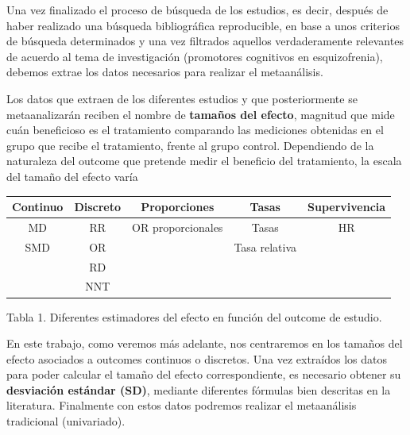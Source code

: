 \documentclass[a4paper,openright,12pt]{report}
\begin{document}
Una vez finalizado el proceso de búsqueda de los estudios, es decir, después de haber realizado una búsqueda bibliográfica reproducible,  en base a unos criterios de búsqueda determinados y una vez filtrados aquellos verdaderamente relevantes de acuerdo al tema de investigación (promotores cognitivos en esquizofrenia), debemos extrae los datos necesarios para realizar el metaanálisis.

Los datos que extraen de los diferentes estudios y que posteriormente se metaanalizarán reciben el nombre de \textbf{tamaños del efecto}, magnitud que mide cuán beneficioso es el tratamiento comparando las mediciones obtenidas en el grupo que recibe el tratamiento, frente al grupo control. Dependiendo de la naturaleza del outcome que pretende medir el beneficio del tratamiento, la escala del tamaño del efecto varía \cite{Cochrane_man}
\newline
\begin{tabular}{|c|c|c|c|c|}\hline
Continuo & Discreto & Proporciones & Tasas & Supervivencia \\\hline \hline
MD & RR & OR proporcionales & Tasas & HR \\\hline
SMD & OR &  & Tasa relativa & \\\hline
 & RD &  &  & \\\hline
 & NNT &  &  & \\\hline
\end{tabular}
\caption{Tabla 1. Diferentes estimadores del efecto en función del outcome de estudio.}


En este trabajo, como veremos más adelante, nos centraremos en los tamaños del efecto asociados a outcomes continuos o discretos. Una vez extraídos los datos para poder calcular el  tamaño del efecto correspondiente, es necesario obtener su \textbf{desviación estándar (SD)}, mediante diferentes fórmulas bien descritas en la literatura. Finalmente con estos datos podremos realizar el metaanálisis tradicional (univariado).
\end{document}
